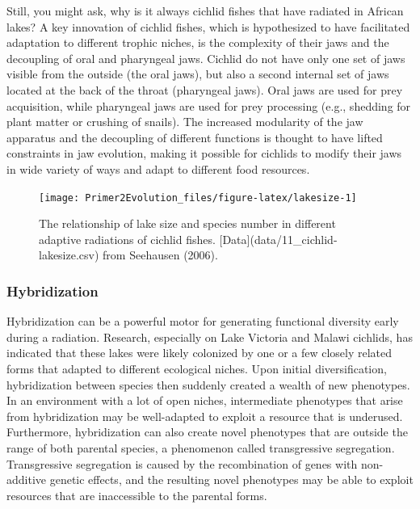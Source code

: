 \documentclass[
]{book}
\begin{document}
Still, you might ask, why is it always cichlid fishes that have radiated in African lakes? A key innovation of cichlid fishes, which is hypothesized to have facilitated adaptation to different trophic niches, is the complexity of their jaws and the decoupling of oral and pharyngeal jaws. Cichlid do not have only one set of jaws visible from the outside (the oral jaws), but also a second internal set of jaws located at the back of the throat (pharyngeal jaws). Oral jaws are used for prey acquisition, while pharyngeal jaws are used for prey processing (e.g., shedding for plant matter or crushing of snails). The increased modularity of the jaw apparatus and the decoupling of different functions is thought to have lifted constraints in jaw evolution, making it possible for cichlids to modify their jaws in wide variety of ways and adapt to different food resources.

\begin{figure}
\texttt{[image: Primer2Evolution\_files/figure-latex/lakesize-1]} \caption{The relationship of lake size and species number in different adaptive radiations of cichlid fishes. [Data](data/11_cichlid-lakesize.csv) from Seehausen (2006).}\label{fig:lakesize}
\end{figure}

\hypertarget{hybridization}{%
\subsubsection*{Hybridization}\label{hybridization}}

Hybridization can be a powerful motor for generating functional diversity early during a radiation. Research, especially on Lake Victoria and Malawi cichlids, has indicated that these lakes were likely colonized by one or a few closely related forms that adapted to different ecological niches. Upon initial diversification, hybridization between species then suddenly created a wealth of new phenotypes. In an environment with a lot of open niches, intermediate phenotypes that arise from hybridization may be well-adapted to exploit a resource that is underused. Furthermore, hybridization can also create novel phenotypes that are outside the range of both parental species, a phenomenon called transgressive segregation. Transgressive segregation is caused by the recombination of genes with non-additive genetic effects, and the resulting novel phenotypes may be able to exploit resources that are inaccessible to the parental forms.
\end{document}
